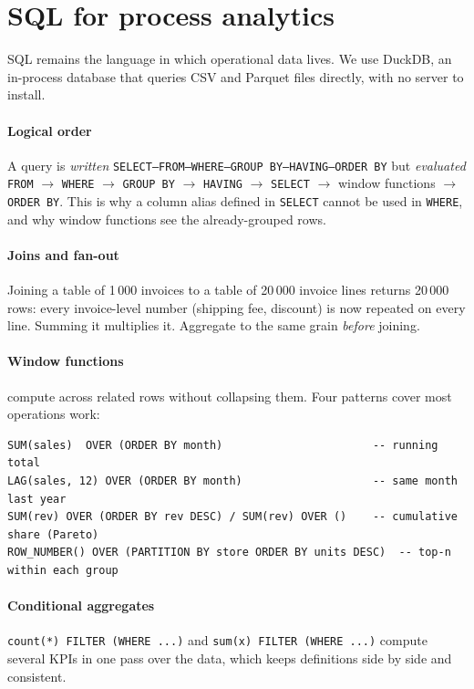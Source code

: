 \section{SQL for process analytics}
SQL remains the language in which operational data lives. We use DuckDB, an in-process database that queries CSV
and Parquet files directly, with no server to install.

\paragraph{Logical order} A query is \emph{written} \texttt{SELECT--FROM--WHERE--GROUP BY--HAVING--ORDER BY} but
\emph{evaluated} \texttt{FROM} $\rightarrow$ \texttt{WHERE} $\rightarrow$ \texttt{GROUP BY} $\rightarrow$
\texttt{HAVING} $\rightarrow$ \texttt{SELECT} $\rightarrow$ window functions $\rightarrow$ \texttt{ORDER BY}. This is why
a column alias defined in \texttt{SELECT} cannot be used in \texttt{WHERE}, and why window functions see the
already-grouped rows.

\paragraph{Joins and fan-out} Joining a table of 1\,000 invoices to a table of 20\,000 invoice lines returns 20\,000
rows: every invoice-level number (shipping fee, discount) is now repeated on every line. Summing it multiplies it.
Aggregate to the same grain \emph{before} joining.

\paragraph{Window functions} compute across related rows without collapsing them. Four patterns cover most
operations work:

\begin{lstlisting}[style=sql,caption={Four window-function patterns used every week.}]
SUM(sales)  OVER (ORDER BY month)                       -- running total
LAG(sales, 12) OVER (ORDER BY month)                    -- same month last year
SUM(rev) OVER (ORDER BY rev DESC) / SUM(rev) OVER ()    -- cumulative share (Pareto)
ROW_NUMBER() OVER (PARTITION BY store ORDER BY units DESC)  -- top-n within each group
\end{lstlisting}

\paragraph{Conditional aggregates} \texttt{count(*) FILTER (WHERE ...)} and \texttt{sum(x) FILTER (WHERE ...)} compute
several KPIs in one pass over the data, which keeps definitions side by side and consistent.

